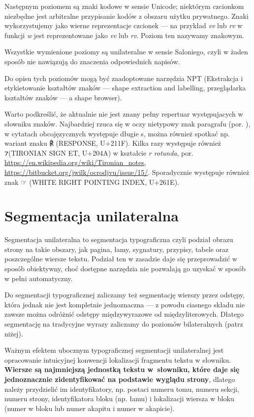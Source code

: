 \documentclass[12]{mwart}
\begin{document}
Następnym poziomem są znaki kodowe w sensie Unicode; niektórym
czcionkom niezbędne jest arbitralne przypisanie kodów z obszaru użytku
prywatnego. Znaki wykorzystujemy jako wierne reprezentacje czcionek
--- na przykład \textit{vv} lub \textit{rv} w funkcji \textit{w} jest
reprezentowane jako \textit{vv} lub \textit{rv}. Poziom ten nazywamy
znakowym.

Wszystkie wymienione poziomy są unilateralne w sensie Saloniego, czyli
w żaden sposób nie nawiązują do znaczenia odpowiednich napisów.

Do opisu tych poziomów mogą być zaadoptowane narzędzia NPT (Ekstrakcja
i etykietowanie kształtów znaków --- shape extraction and labelling,
przeglądarka kształtów znaków --- a shape browser).

Warto podkreślić, że aktualnie nie jest znany pełny repertuar
występujacych w słowniku znaków. Najbardziej rzuca się w oczy
nietypowy znak paragrafu (por. \citep[s.~98]{bc347}), w cytatach
obcojęzycznych występuje długie s, można również spotkać np. wariant
znaku {\setmainfont{DejaVu Sans} ℟} (RESPONSE, U+211F). Kilka razy
występuje również {\setmainfont{DejaVu Sans} ⁊}(TIRONIAN SIGN ET,
U+204A) w kształcie \textit{r rotunda},
por. \url{https://en.wikipedia.org/wiki/Tironian_notes},
\url{https://bitbucket.org/jwilk/ocrodjvu/issue/15/}. Sporadycznie
występuje również znak {\setmainfont{DejaVu Sans} ☞} (WHITE RIGHT
POINTING INDEX, U+261E).

\section{Segmentacja unilateralna}
\label{sec:segm-unil}

Segmentacja unilateralna to segmentacja typograficzna czyli podział
obrazu strony na takie obszary, jak pagina, łamy, sygnatury, przypisy,
tabele oraz poszczególne wiersze tekstu. Podział ten w zasadzie daje
się przeprowadzić w sposób obiektywny, choć dostępne narzędzia nie
pozwalają go uzyskać w sposób w pełni automatyczny.

Do segmentacji typograficznej zaliczamy też segmentację wierszy przez
odstępy, która jednak nie jest kompletnie jednoznaczna --- z powodu
ciasnego składu nie zawsze można odróżnić odstępy międzywyrazowe od
międzyliterowych. Dlatego segmentację na tradycyjne wyrazy zaliczamy do
poziomów bilateralnych (patrz niżej).

Ważnym efektem ubocznym typograficznej segmentacji unilateralnej jest
opracowanie intuicyjnej konwencji lokalizacji fragmentu tekstu w
słowniku. \textbf{Wiersze są najmniejszą jednostką tekstu w~słowniku,
  które daje się jednoznacznie zidentyfikować na podstawie wyglądu
  strony}, dlatego należy przydzielić im identyfikatory, np. postaci
numeru tomu, numeru sekcji, numeru strony, identyfikatora bloku
(np. łamu) i lokalizacji wiersza w bloku (numer w bloku lub numer
akapitu i numer w akapicie).
\end{document}
